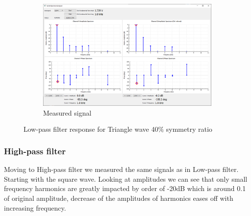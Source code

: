 \documentclass[notitlepage, a4paper, 11pt]{article}
\begin{document}
\begin{figure}[H]
\begin{subfigure}[][][t]{0.45\textwidth}
			\includegraphics[width=\textwidth, trim=10 80 10 100, clip]{../img/Circuit1/trig40}
			\caption{Measured signal}
		\end{subfigure}
		\caption{Low-pass filter response for Triangle wave 40\% symmetry ratio}
	\end{figure}
	
	\subsubsection{High-pass filter}
	
	Moving to High-pass filter we measured the same signals as in Low-pass filter. Starting with the square wave. Looking at amplitudes we can see that only small frequency harmonics are greatly impacted by order of -20dB which is around 0.1 of original amplitude, decrease of the amplitudes of harmonics eases off with increasing frequency.
	
\end{document}

